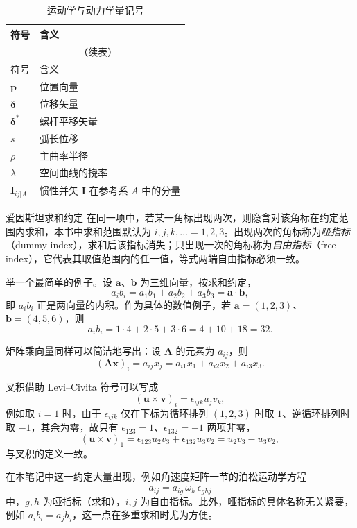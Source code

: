 \begin{longtable}{ll}
	\caption{运动学与动力学量记号}\label{tab:符号说明:运动学}\\
	\toprule
	符号 & 含义 \\
	\midrule
	\endfirsthead
	\multicolumn{2}{c}{\tablename~\thetable{}（续表）}\\
	\toprule
	符号 & 含义 \\
	\midrule
	\endhead
	$\mathbf{p}$ & 位置向量 \\
	$\bm{\delta}$ & 位移矢量 \\
	$\bm{\delta}^{*}$ & 螺杆平移矢量 \\
	$s$ & 弧长位移 \\
	$\rho$ & 主曲率半径 \\
	$\lambda$ & 空间曲线的挠率 \\
	$\bm{I}_{ij|A}$ & 惯性并矢 $\bm{I}$ 在参考系 $A$ 中的分量 \\
	\bottomrule
\end{longtable}

\begin{mydefinition}{爱因斯坦求和约定}
	在同一项中，若某一角标出现两次，则隐含对该角标在约定范围内求和，本书中求和范围默认为 $i,j,k,\dots=1,2,3$。出现两次的角标称为\emph{哑指标}（dummy index），求和后该指标消失；只出现一次的角标称为\emph{自由指标}（free index），它代表其取值范围内的任一值，等式两端自由指标必须一致。
\end{mydefinition}

举一个最简单的例子。设 $\bm{a}$、$\bm{b}$ 为三维向量，按求和约定，
\begin{equation}
	a_ib_i=a_1b_1+a_2b_2+a_3b_3=\bm{a}\cdot\bm{b},
	\label{eq:符号说明:求和内积}
\end{equation}
即 $a_ib_i$ 正是两向量的内积。作为具体的数值例子，若 $\bm{a}=(1,2,3)$、$\bm{b}=(4,5,6)$，则
\begin{equation}
	a_ib_i=1\cdot4+2\cdot5+3\cdot6=4+10+18=32.
\end{equation}

矩阵乘向量同样可以简洁地写出：设 $\bm{A}$ 的元素为 $a_{ij}$，则
\begin{equation}
	(\bm{A}\bm{x})_i=a_{ij}x_j=a_{i1}x_1+a_{i2}x_2+a_{i3}x_3.
\end{equation}

叉积借助 Levi--Civita 符号可以写成
\begin{equation}
	(\bm{u}\times\bm{v})_i=\epsilon_{ijk}u_jv_k,
\end{equation}
例如取 $i=1$ 时，由于 $\epsilon_{ijk}$ 仅在下标为循环排列 $(1,2,3)$ 时取 $1$、逆循环排列时取 $-1$，其余为零，故只有 $\epsilon_{123}=1$、$\epsilon_{132}=-1$ 两项非零，
\begin{equation}
	(\bm{u}\times\bm{v})_1=\epsilon_{123}u_2v_3+\epsilon_{132}u_3v_2=u_2v_3-u_3v_2,
\end{equation}
与叉积的定义一致。

在本笔记中这一约定大量出现，例如角速度矩阵一节的泊松运动学方程
\begin{equation}
	\dot{a}_{ij}=a_{ig}\,\omega_h\,\epsilon_{ghj}
\end{equation}
中，$g,h$ 为哑指标（求和），$i,j$ 为自由指标。此外，哑指标的具体名称无关紧要，例如 $a_ib_i=a_jb_j$，这一点在多重求和时尤为方便。